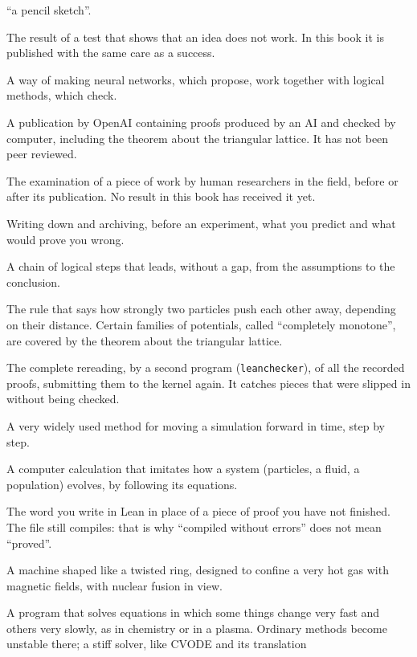 \begin{description}[style=nextline,leftmargin=0pt,font=\normalfont\sffamily\bfseries\color{okbleu},itemsep=5pt]
``a pencil sketch''.
\item[Negative result] The result of a test that shows that an idea does not work. In this book it is published with the
same care as a success.
\item[Neuro-symbolic] A way of making neural networks, which propose, work together with logical methods, which check.
\item[openai/math] A publication by OpenAI containing proofs produced by an AI and checked by computer, including the
theorem about the triangular lattice. It has not been peer reviewed.
\item[Peer review] The examination of a piece of work by human researchers in the field, before or after its
publication. No result in this book has received it yet.
\item[Preregistration] Writing down and archiving, before an experiment, what you predict and what would prove you
wrong.
\item[Proof] A chain of logical steps that leads, without a gap, from the assumptions to the conclusion.
\item[Repulsive potential (or force)] The rule that says how strongly two particles push each other away, depending on
their distance. Certain families of potentials, called ``completely monotone'', are covered by the theorem about the
triangular lattice.
\item[Replay] The complete rereading, by a second program (\texttt{leanchecker}), of all the recorded proofs, submitting
them to the kernel again. It catches pieces that were slipped in without being checked.
\item[RK4] A very widely used method for moving a simulation forward in time, step by step.
\item[Simulation] A computer calculation that imitates how a system (particles, a fluid, a population) evolves, by
following its equations.
\item[sorry] The word you write in Lean in place of a piece of proof you have not finished. The file still compiles:
that is why ``compiled without errors'' does not mean ``proved''.
\item[Stellarator] A machine shaped like a twisted ring, designed to confine a very hot gas with magnetic fields, with
nuclear fusion in view.
\item[Stiff solver] A program that solves equations in which some things change very fast and others very slowly, as in
chemistry or in a plasma. Ordinary methods become unstable there; a stiff solver, like CVODE and its translation

\end{description}

